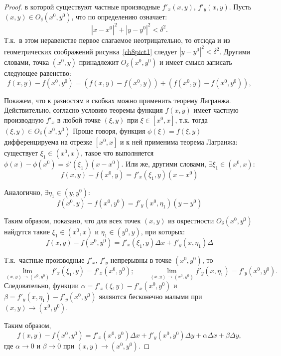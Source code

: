 \begin{proof}
 в которой существуют частные производные $f'_x(x,y)$, $f'_y(x,y)$. Пусть $(x,y) \in O_\delta(x^0, y^0)$, что по определению означает:
$$
|x - x^0|^2 + |y - y^0|^2 < \delta^2.
$$ 
Т.к.~в этом неравенстве первое слагаемое неотрицательно, то отсюда и из геометрических соображений рисунка~\ref{ch8pict1} следует $|y - y^0|^2 < \delta^2$. Другими словами, точка $(x^0, y)$ принадлежит $O_\delta(x^0, y^0)$ и имеет смысл записать следующее равенство:
\begin{equation*}
f(x,y) - f(x^0, y^0) = (f(x,y) - f(x^0, y)) + (f(x^0, y) - f(x^0, y^0)),
\end{equation*}

Покажем, что к разностям в скобках можно применить теорему Лагранжа. Действительно, согласно условию теоремы функция $f(x, y)$ имеет частную производную $f'_x$ в любой точке $(\xi, y)$  при $\xi \in [x^0, x]$, т.к. тогда $(\xi, y) \in O_\delta(x^0, y^0)$ Проще говоря, функция $\phi(\xi)=f(\xi, y)$ дифференцируема на отрезке $[x^0, x]$ и к ней применима теорема Лагранжа: существует $\xi_1 \in (x^0, x)$, такое что выполняется $\phi(x) - \phi(x^0) = \phi'(\xi_1)(x - x^0)$. Или же, другими словами, $\exists \xi_1 \in (x^0, x)$:
$$
f(x,y) - f(x^0, y) = f'_x(\xi_1, y)(x - x^0)
$$

Аналогично, $\exists \eta_1 \in (y, y^0)$:
$$
f(x^0, y) - f(x^0, y^0) = f'_y(x^0, \eta_1)(y - y^0)
$$ 

Таким образом, показано, что для всех точек $(x,y)$ из окрестности $O_\delta(x^0, y^0)$ найдутся такие $\xi_1 \in (x^0, x)$ и $\eta_1 \in (y^0, y)$, при которых:
$$
f(x,y) - f(x^0, y^0) = f'_x(\xi_1, y) \Delta x + f'_y(x, \eta_1) \Delta 
$$

Т.к.~частные производные $f'_x$, $f'_y$ непрерывны в точке $(x^0, y^0)$, то 
$$
\lim\limits_{(x,y) \to (x^0, y^0)} f'_x(\xi_1, y) = f'_x(x^0, y^0);\qquad 
\lim\limits_{(x,y) \to (x^0, y^0)} f'_y(x, \eta_1) = f'_y(x^0, y^0).
$$
Следовательно, функции $\alpha =  f'_x(\xi, y) - f'_x(x^0, y^0)$ и $\beta =  f'_y(x, \eta_1) - f'_y(x^0, y^0)$ являются бесконечно малыми при $(x,y) \to (x^0, y^0)$. 

Таким образом,
$$
f(x,y) - f(x^0, y^0) = f'_x(x^0, y^0) \Delta x + f'_y(x^0, y^0) \Delta y + \alpha \Delta x + \beta \Delta y,
$$
где $\alpha \to 0$ и $\beta \to 0$ при $(x,y)\to(x^0,y^0)$.


\end{proof}
